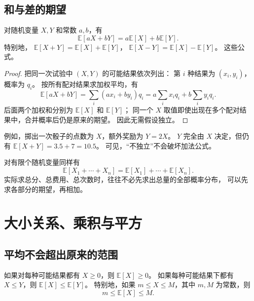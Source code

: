 \documentclass[UTF8]{ctexart}
\begin{document}
\subsection{和与差的期望}

\begin{property}[期望的线性性]
\label{prop:basic-expectation-linearity}
对随机变量 $X,Y$ 和常数 $a,b$，有
\begin{equation}
  \mathbb E[aX+bY]=a\mathbb E[X]+b\mathbb E[Y].
  \label{eq:basic-expectation-linearity}
\end{equation}
特别地，
$\mathbb E[X+Y]=\mathbb E[X]+\mathbb E[Y]$，
$\mathbb E[X-Y]=\mathbb E[X]-\mathbb E[Y]$。
这些公式。
\end{property}

\begin{proof}
把同一次试验中 $(X,Y)$ 的可能结果依次列出：
第 $i$ 种结果为 $(x_i,y_i)$，概率为 $q_i$。
按所有配对结果求加权平均，有
\[
  \mathbb E[aX+bY]
  =\sum_i(ax_i+by_i)q_i
  =a\sum_i x_iq_i+b\sum_i y_iq_i.
\]
后面两个加权和分别为 $\mathbb E[X]$ 和 $\mathbb E[Y]$；
同一个 $X$ 取值即使出现在多个配对结果中，合并概率后仍是原来的期望。
因此无需假设独立。
\end{proof}

例如，掷出一次骰子的点数为 $X$，额外奖励为 $Y=2X$。
$Y$ 完全由 $X$ 决定，但仍有
$\mathbb E[X+Y]=3.5+7=10.5$。
可见，“不独立”不会破坏加法公式。

对有限个随机变量同样有
\[
  \mathbb E[X_1+\cdots+X_n]
  =\mathbb E[X_1]+\cdots+\mathbb E[X_n].
\]
实际求总分、总费用、总次数时，往往不必先求出总量的全部概率分布，
可以先求各部分的期望，再相加。

\section{大小关系、乘积与平方}
\label{sec:basic-expectation-other-properties}

\subsection{平均不会超出原来的范围}

\begin{property}[非负性与大小关系]
如果对每种可能结果都有 $X\geq0$，则 $\mathbb E[X]\geq0$。
如果每种可能结果下都有 $X\leq Y$，则 $\mathbb E[X]\leq\mathbb E[Y]$。
特别地，如果 $m\leq X\leq M$，其中 $m,M$ 为常数，则
\[
  m\leq\mathbb E[X]\leq M.
\]
\end{property}
\end{document}
